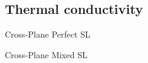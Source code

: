 \documentclass{beamer}
\begin{document}


\subsection{Thermal conductivity}
\begin{frame}{Cross-Plane Perfect SL}
\begin{figure}[t]
\begin{center}
\vspace*{-0.8cm}
\renewcommand{\figure}{Fig.}
\label{fig:cp}
\end{center}
\end{figure}
\end{frame}

\begin{frame}{Cross-Plane Mixed SL}
\begin{figure}[t]
\begin{center}
\vspace*{-0.8cm}
\renewcommand{\figure}{Fig.}
\label{fig:cp_all}
\end{center}
\end{figure}
\end{frame}
\end{document}
